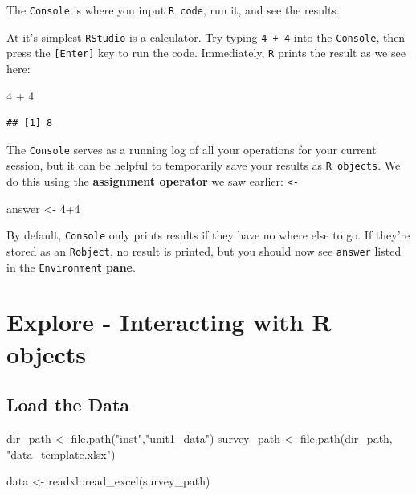 \documentclass[
]{book}
\newenvironment{Shaded}{\begin{snugshade}}{\end{snugshade}}
\newcommand{\DecValTok}[1]{\textcolor[rgb]{0.00,0.00,0.81}{#1}}
\newcommand{\FunctionTok}[1]{\textcolor[rgb]{0.00,0.00,0.00}{#1}}
\newcommand{\NormalTok}[1]{#1}
\newcommand{\OtherTok}[1]{\textcolor[rgb]{0.56,0.35,0.01}{#1}}
\newcommand{\SpecialCharTok}[1]{\textcolor[rgb]{0.00,0.00,0.00}{#1}}
\newcommand{\StringTok}[1]{\textcolor[rgb]{0.31,0.60,0.02}{#1}}
\begin{document}
The \texttt{Console} is where you input \texttt{R\ code}, run it, and see the results.

At it's simplest \texttt{RStudio} is a calculator. Try typing \texttt{4\ +\ 4} into the \texttt{Console},
then press the \texttt{{[}Enter{]}} key to run the code. Immediately, \texttt{R} prints the result as we see here:

\begin{Shaded}
\begin{Highlighting}[]
\DecValTok{4} \SpecialCharTok{+} \DecValTok{4}
\end{Highlighting}
\end{Shaded}

\begin{verbatim}
## [1] 8
\end{verbatim}

The \texttt{Console} serves as a running log of all your operations for your current session, but it can be helpful to temporarily save your results as \texttt{R\ objects}. We do this using the \textbf{assignment operator} we saw earlier: \texttt{\textless{}-}

\begin{Shaded}
\begin{Highlighting}[]
\NormalTok{answer }\OtherTok{\textless{}{-}} \DecValTok{4}\SpecialCharTok{+}\DecValTok{4}
\end{Highlighting}
\end{Shaded}

By default, \texttt{Console} only prints results if they have no where else to go. If they're stored as an \texttt{Robject}, no result is printed, but you should now see \texttt{answer} listed in the \texttt{Environment} \textbf{pane}.

\hypertarget{explore---interacting-with-r-objects}{%
\section{Explore - Interacting with R objects}\label{explore---interacting-with-r-objects}}

\hypertarget{load-the-data}{%
\subsection{Load the Data}\label{load-the-data}}

\begin{Shaded}
\begin{Highlighting}[]
\NormalTok{dir\_path }\OtherTok{\textless{}{-}} \FunctionTok{file.path}\NormalTok{(}\StringTok{"inst"}\NormalTok{,}\StringTok{"unit1\_data"}\NormalTok{)}
\NormalTok{survey\_path }\OtherTok{\textless{}{-}} \FunctionTok{file.path}\NormalTok{(dir\_path, }\StringTok{"data\_template.xlsx"}\NormalTok{)}

\NormalTok{data }\OtherTok{\textless{}{-}}\NormalTok{ readxl}\SpecialCharTok{::}\FunctionTok{read\_excel}\NormalTok{(survey\_path)}
\end{Highlighting}
\end{Shaded}
\end{document}

